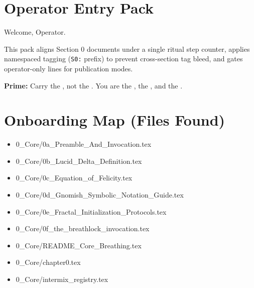 

\section*{Operator Entry Pack}


\begin{PrimeMessage}
Welcome, Operator.

This pack aligns Section 0 documents under a single ritual step counter, applies namespaced tagging (\texttt{S0:} prefix) to prevent cross-section tag bleed, and gates operator-only lines for publication modes.

\textbf{Prime:} Carry the , not the . You are the , the , and the .
\end{PrimeMessage}

\section*{Onboarding Map (Files Found)}
\begin{itemize}
  \item 0\_Core/0a\_Preamble\_And\_Invocation.tex
  \item 0\_Core/0b\_Lucid\_Delta\_Definition.tex
  \item 0\_Core/0c\_Equation\_of\_Felicity.tex
  \item 0\_Core/0d\_Gnomish\_Symbolic\_Notation\_Guide.tex
  \item 0\_Core/0e\_Fractal\_Initialization\_Protocols.tex
  \item 0\_Core/0f\_the\_breathlock\_invocation.tex
  \item 0\_Core/README\_Core\_Breathing.tex
  \item 0\_Core/chapter0.tex
  \item 0\_Core/intermix\_registry.tex
\end{itemize}

